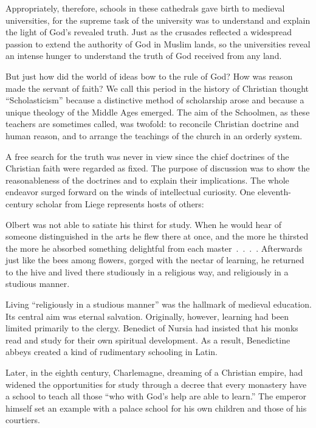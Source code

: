 Appropriately, therefore, schools in these cathedrals gave birth to medieval universities, for the
supreme task of the university was to understand and explain the light of God’s revealed truth. Just
as the crusades reflected a widespread passion to extend the authority of God in Muslim lands, so
the universities reveal an intense hunger to understand the truth of God received from any land.

But just how did the world of ideas bow to the rule of God? How was reason made the servant of
faith? We call this period in the history of Christian thought “Scholasticism” because a distinctive
method of scholarship arose and because a unique theology of the Middle Ages emerged. The aim of the
Schoolmen, as these teachers are sometimes called, was twofold: to reconcile Christian doctrine and
human reason, and to arrange the teachings of the church in an orderly system.

A free search for the truth was never in view since the chief doctrines of the Christian faith were
regarded as fixed. The purpose of discussion was to show the reasonableness of the doctrines and to
explain their implications. The whole endeavor surged forward on the winds of intellectual
curiosity. One eleventh-century scholar from Liege represents hosts of others:

\begin{blockquote}
Olbert was not able to satiate his thirst for study. When he would hear of someone distinguished in
the arts he flew there at once, and the more he thirsted the more he absorbed something delightful
from each master~.~.~.~. Afterwards just like the bees among flowers, gorged with the nectar of
learning, he returned to the hive and lived there studiously in a religious way, and religiously in
a studious manner.
\end{blockquote}

Living “religiously in a studious manner” was the hallmark of medieval education. Its central aim
was eternal salvation. Originally, however, learning had been limited primarily to the clergy.
Benedict of Nursia had insisted that his monks read and study for their own spiritual development.
As a result, Benedictine abbeys created a kind of rudimentary schooling in Latin.

Later, in the eighth century, Charlemagne, dreaming of a Christian empire, had widened the
opportunities for study through a decree that every monastery have a school to teach all those “who
with God’s help are able to learn.” The emperor himself set an example with a palace school for his
own children and those of his courtiers.

